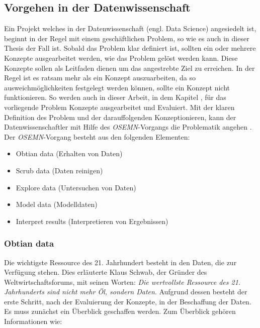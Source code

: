\subsection{Vorgehen in der Datenwissenschaft}
\label{subsec:ds_vorgehen}
Ein Projekt welches in der Datenwissenschaft (engl. Data Science) angesiedelt ist, beginnt in der Regel mit einem geschäftlichen Problem, so wie es auch in dieser Thesis der Fall ist. Sobald das Problem klar definiert ist, sollten ein oder mehrere Konzepte ausgearbeitet werden, wie das Problem gelöst werden kann. Diese Konzepte sollen als Leitfaden dienen um das angestrebte Ziel zu erreichen. In der Regel ist es ratsam mehr als ein Konzept auszuarbeiten, da so ausweichmöglichkeiten festgelegt werden können, sollte ein Konzept nicht funktionieren. So werden auch in dieser Arbeit, in dem Kapitel \emph{}, für das vorliegende Problem Konzepte ausgearbeitet und Evaluiert. 
\newline
\newline
Mit der klaren Definition des Problem und der darauffolgenden Konzeptionieren, kann der Datenwissenschaftler mit Hilfe des \emph{OSEMN}-Vorgangs die Problematik angehen \cite{Vorgehen_ds}. 
\newline
\newline
Der \emph{OSEMN}-Vorgang besteht aus den folgenden Elementen:

\begin{itemize}
    \item Obtian data (Erhalten von Daten)
    \item Scrub data (Daten reinigen)
    \item Explore data (Untersuchen von Daten)
    \item Model data (Modelldaten)
    \item Interpret results (Interpretieren von Ergebnissen)
\end{itemize}

\subsubsection{Obtian data}
Die wichtigste Ressource des 21. Jahrhundert besteht in den Daten, die zur Verfügung stehen. Dies erläuterte  Klaus Schwab, der Gründer des Weltwirtschaftsforums, mit seinen Worten: \emph{Die wertvollste Ressource des 21. Jahrhunderts sind nicht mehr Öl, sondern Daten}. Aufgrund dessen besteht der erste Schritt, nach der Evaluierung der Konzepte, in der Beschaffung der Daten. Es muss zunächst ein Überblick geschaffen werden. Zum Überblick gehören Informationen wie:

